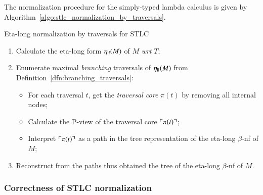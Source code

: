 \documentclass{elsarticle}
\theoremstyle{plain}
\theoremstyle{definition}
\theoremstyle{remark}
\def\coresymbol{\pi} %
\newcommand{\core}[1]{\coresymbol(#1)} %
\begin{document}
The normalization procedure for the simply-typed lambda calculus is given by Algorithm~\ref{algo:stlc_normalization_by_traversals}.

\begin{algorithm}[!ht]
\caption{Eta-long normalization by traversals for STLC}
\label{algo:stlc_normalization_by_traversals}
\begin{algorithmic}
\begin{enumerate}[nosep]
  \item Calculate the eta-long form $\eta_{\sf lf}(M)$ of $M$ \emph{wrt} $T$;
  \item Enumerate maximal \emph{branching} traversals of $\eta_{\sf lf}(M)$ from Definition~\ref{dfn:branching_traversals}:
  \begin{itemize}[nosep]
  \item For each traversal $t$, get the \emph{traversal core} $\core{t}$ by removing all internal nodes;
  \item Calculate the P-view of the traversal core $\pview{\core{t}}$;
  \item Interpret $\pview{\core{t}}$ as a path in the tree representation of the eta-long $\beta$-nf of $M$;
  \end{itemize}
  \item Reconstruct from the paths thus obtained the tree of the eta-long $\beta$-nf of $M$.
\end{enumerate}
\end{algorithmic}
\end{algorithm}

\subsubsection*{Correctness of STLC normalization}

\end{document}
